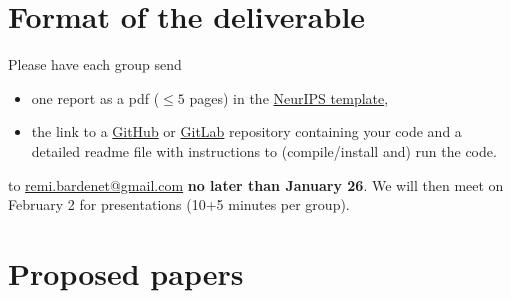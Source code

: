 \documentclass[12pt]{article}%
\begin{document}
\section{Format of the deliverable}
Please have each group send
\begin{itemize}
\item one report as a pdf ($\leq 5$ pages) in the \href{https://www.overleaf.com/latex/templates/neurips-2020/mnshsmqkjsqz}{NeurIPS template},
\item the link to a \href{https://github.com/}{GitHub} or  \href{https://about.gitlab.com/}{GitLab} repository containing your code and a detailed readme file with
  instructions to (compile/install and) run the code.
\end{itemize} to \href{mailto:remi.bardenet@gmail.com}{remi.bardenet@gmail.com} {\bf no later than January 26}. We will then meet on February 2 for presentations (10+5 minutes per group).

\section{Proposed papers}
\label{s:papers}



\end{document}
